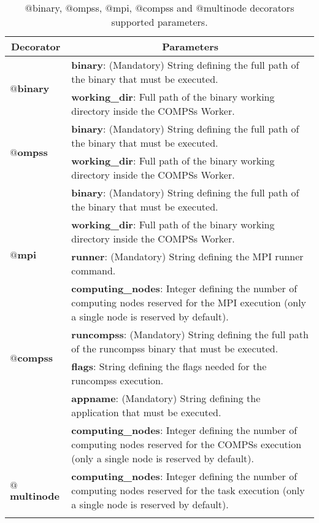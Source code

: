 \bgroup
  \def\arraystretch{1.5}%
  \begin{longtable}{| p{} | p{} |}
    \hline
    \multicolumn{1}{|c|}{{\bf Decorator }} &  \multicolumn{1}{c|}{{\bf Parameters }}\\
    \hline
        \multirow{2}{*}{{\bf $@$binary}} & {\bf binary}: (Mandatory) String defining the full path of the binary that must be executed. \\
                                         & {\bf working\_dir}: Full path of the binary working directory inside the COMPSs Worker. \\
    \hline
        \multirow{2}{*}{{\bf $@$ompss}} & {\bf binary}: (Mandatory) String defining the full path of the binary that must be executed. \\
                                        & {\bf working\_dir}: Full path of the binary working directory inside the COMPSs Worker. \\
    \hline
        \multirow{4}{*}{{\bf $@$mpi}} & {\bf binary}: (Mandatory) String defining the full path of the binary that must be executed. \\
                                      & {\bf working\_dir}: Full path of the binary working directory inside the COMPSs Worker. \\
                                      & {\bf runner}: (Mandatory) String defining the MPI runner command. \\
                                      & {\bf computing\_nodes}: Integer defining the number of computing nodes reserved for the MPI execution
                                        (only a single node is reserved by default). \\
    \hline
        \multirow{2}{*}{{\bf $@$compss}} & {\bf runcompss}: (Mandatory) String defining the full path of the runcompss binary that must be executed. \\
                                         & {\bf flags}: String defining the flags needed for the runcompss execution. \\
                                         & {\bf appname}: (Mandatory) String defining the application that must be executed. \\
                                         & {\bf computing\_nodes}: Integer defining the number of computing nodes reserved for the COMPSs execution
                                           (only a single node is reserved by default). \\
    \hline
        \multirow{2}{*}{{\bf $@$multinode}} & {\bf computing\_nodes}: Integer defining the number of computing nodes reserved for the task execution
                                              (only a single node is reserved by default). \\
    \hline
     \caption{$@$binary, $@$ompss, $@$mpi, $@$compss and $@$multinode decorators supported parameters.}
    \label{tab:other_decorators}
  \end{longtable}
\egroup

